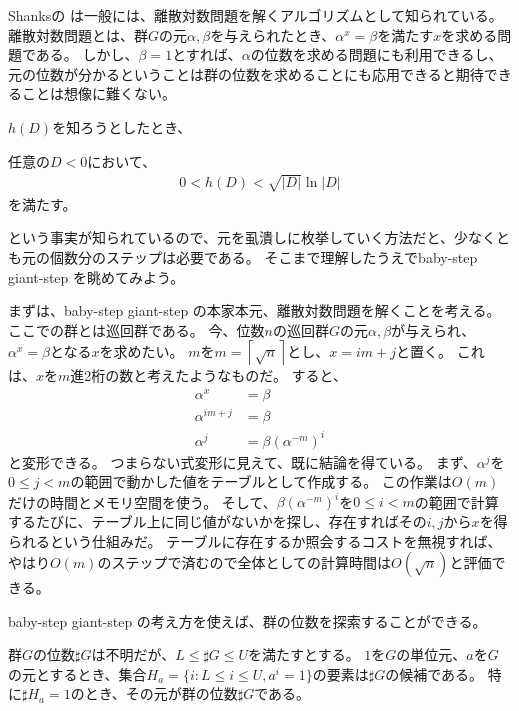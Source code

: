 Shanksの  は一般には、離散対数問題を解くアルゴリズムとして知られている。
離散対数問題とは、群$G$の元$\alpha,\beta$を与えられたとき、$\alpha^x=\beta$を満たす$x$を求める問題である。
しかし、$\beta=1$とすれば、$\alpha$の位数を求める問題にも利用できるし、元の位数が分かるということは群の位数を求めることにも応用できると期待できることは想像に難くない。

$h(D)$を知ろうとしたとき、

\begin{Prop}{}{}
任意の$D<0$において、
\begin{align*}
0 < h(D) < \sqrt{|D|}\ln{|D|}
\end{align*}
を満たす。
\end{Prop}

という事実が知られているので、元を虱潰しに枚挙していく方法だと、少なくとも元の個数分のステップは必要である。
そこまで理解したうえでbaby-step giant-step を眺めてみよう。

まずは、baby-step giant-step の本家本元、離散対数問題を解くことを考える。
ここでの群とは巡回群である。
今、位数$n$の巡回群$G$の元$\alpha,\beta$が与えられ、$\alpha^x=\beta$となる$x$を求めたい。
$m$を$m=\left\lceil \sqrt{n} \right\rceil$とし、$x=im+j$と置く。
これは、$x$を$m$進2桁の数と考えたようなものだ。
すると、
\begin{align*}
\alpha^x &= \beta\\
\alpha^{im+j} &= \beta\\
\alpha^j &= \beta(\alpha^{-m})^i
\end{align*}
と変形できる。
つまらない式変形に見えて、既に結論を得ている。
まず、$\alpha^j$を$0\le j<m$の範囲で動かした値をテーブルとして作成する。
この作業は$O(m)$だけの時間とメモリ空間を使う。
そして、$\beta(\alpha^{-m})^i$を$0\le i<m$の範囲で計算するたびに、テーブル上に同じ値がないかを探し、存在すればその$i,j$から$x$を得られるという仕組みだ。
テーブルに存在するか照会するコストを無視すれば、やはり$O(m)$のステップで済むので全体としての計算時間は$O(\sqrt{n})$と評価できる。

baby-step giant-step の考え方を使えば、群の位数を探索することができる。

\begin{Prop}{}{}
群$G$の位数$\sharp G$は不明だが、$L\le\sharp G\le U$を満たすとする。
$1$を$G$の単位元、$a$を$G$の元とするとき、集合$H_a=\{i: L \le i \le U, a^i = 1 \}$の要素は$\sharp G$の候補である。
特に$\sharp H_a=1$のとき、その元が群の位数$\sharp G$である。
\end{Prop}

